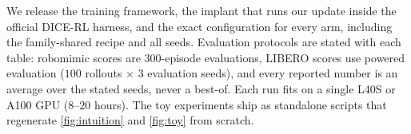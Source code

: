 We release the training framework, the implant that runs our update inside
the official DICE-RL harness, and the exact configuration for every arm,
including the family-shared recipe and all seeds. Evaluation protocols are
stated with each table: robomimic scores are $300$-episode evaluations,
LIBERO scores use powered evaluation ($100$ rollouts $\times$ $3$ evaluation
seeds), and every reported number is an average over the stated seeds, never
a best-of. Each run fits on a single L40S or A100 GPU ($8$--$20$ hours). The
toy experiments ship as standalone scripts that regenerate
\cref{fig:intuition} and \cref{fig:toy} from scratch.
